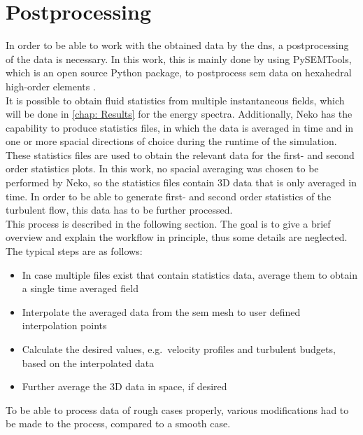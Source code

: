 \section{Postprocessing}\label{sec: Postprocessing}
In order to be able to work with the obtained data by the \acrshort{dns}, a postprocessing of the data is necessary.
In this work, this is mainly done by using PySEMTools, which is an open source Python package, to postprocess \acrshort{sem} data on hexahedral high-order elements \citep{perezPySEMToolsLibraryPostprocessing2026}.\\
It is possible to obtain fluid statistics from multiple instantaneous fields, which will be done in \autoref{chap: Results} for the energy spectra.
Additionally, Neko has the capability to produce statistics files, in which the data is averaged in time and in one or more spacial directions of choice during the runtime of the simulation.
These statistics files are used to obtain the relevant data for the first- and second order statistics plots.
In this work, no spacial averaging was chosen to be performed by Neko, so the statistics files contain 3D data that is only averaged in time.
In order to be able to generate first- and second order statistics of the turbulent flow, this data has to be further processed.\\
This process is described in the following section. 
The goal is to give a brief overview and explain the workflow in principle, thus some details are neglected.
The typical steps are as follows:
\begin{itemize}
    \item In case multiple files exist that contain statistics data, average them to obtain a single time averaged field
    \item Interpolate the averaged data from the \acrshort{sem} mesh to user defined interpolation points
    \item Calculate the desired values, e.g.\ velocity profiles and turbulent budgets, based on the interpolated data
    \item Further average the 3D data in space, if desired
\end{itemize}
To be able to process data of rough cases properly, various modifications had to be made to the process, compared to a smooth case.
